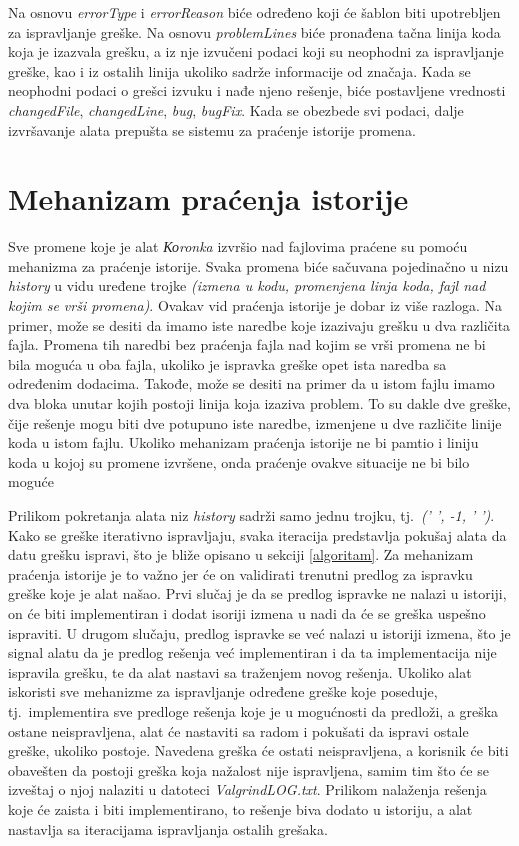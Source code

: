 \documentclass[12pt,oneside]{memoir}
\theoremstyle{plain}
\theoremstyle{definition}
\begin{document}
Na osnovu \textit{errorType} i \textit{errorReason} biće određeno koji će šablon biti upotrebljen za ispravljanje greške. Na osnovu \textit{problemLines} biće pronađena tačna linija koda koja je izazvala grešku, a iz nje izvučeni podaci koji su neophodni za ispravljanje greške, kao i iz ostalih linija ukoliko sadrže informacije od značaja. Kada se neophodni podaci o grešci izvuku i nađe njeno rešenje, biće postavljene vrednosti \textit{changedFile}, \textit{changedLine}, \textit{bug}, \textit{bugFix}. Kada se obezbede svi podaci, dalje izvršavanje alata prepušta se sistemu za praćenje istorije promena.

\section{Mehanizam praćenja istorije}\label{istorija}
Sve promene koje je alat \textit{Коronka} izvršio nad fajlovima praćene su pomoću mehanizma za praćenje istorije. Svaka promena biće sačuvana pojedinačno u nizu \textit{history} u vidu uređene trojke \textit{(izmena u kodu, promenjena linja koda, fajl nad kojim se vrši promena)}. Ovakav vid praćenja istorije je dobar iz više razloga. Na primer, može se desiti da imamo iste naredbe koje izazivaju grešku u dva različita fajla. Promena tih naredbi bez praćenja fajla nad kojim se vrši promena ne bi bila moguća u oba fajla, ukoliko je ispravka greške opet ista naredba sa određenim dodacima. Takođe, može se desiti na primer da u istom fajlu imamo dva bloka unutar kojih postoji linija koja izaziva problem. To su dakle dve greške, čije rešenje mogu biti dve potupuno iste naredbe, izmenjene u dve različite linije koda u istom fajlu. Ukoliko mehanizam praćenja istorije ne bi pamtio i liniju koda u kojoj su promene izvršene, onda praćenje ovakve situacije ne bi bilo moguće 

Prilikom pokretanja alata niz \textit{history} sadrži samo jednu trojku, tj.~\textit{(' ', -1, ' ')}. Kako se greške iterativno ispravljaju, svaka iteracija predstavlja pokušaj alata da datu grešku ispravi, što je bliže opisano u sekciji \ref{algoritam}. Za mehanizam praćenja istorije je to važno jer će on validirati trenutni predlog za ispravku greške koje je alat našao. Prvi slučaj je da se predlog ispravke ne nalazi u istoriji, on će biti implementiran i dodat isoriji izmena u nadi da će se greška uspešno ispraviti. U drugom slučaju, predlog ispravke se već nalazi u istoriji izmena, što je signal alatu da je predlog rešenja već implementiran i da ta implementacija nije ispravila grešku, te da alat nastavi sa traženjem novog rešenja. Ukoliko alat iskoristi sve mehanizme za ispravljanje određene greške koje poseduje, tj.~implementira sve predloge rešenja koje je u mogućnosti da predloži, a greška ostane neispravljena, alat će nastaviti sa radom i pokušati da ispravi ostale greške, ukoliko postoje. Navedena greška će ostati neispravljena, a korisnik će biti obavešten da postoji greška koja nažalost nije ispravljena, samim tim što će se izveštaj o njoj nalaziti u datoteci \textit{ValgrindLOG.txt}. Prilikom nalaženja rešenja koje će zaista i biti implementirano, to rešenje biva dodato u istoriju, a alat nastavlja sa iteracijama ispravljanja ostalih grešaka.
\end{document}
